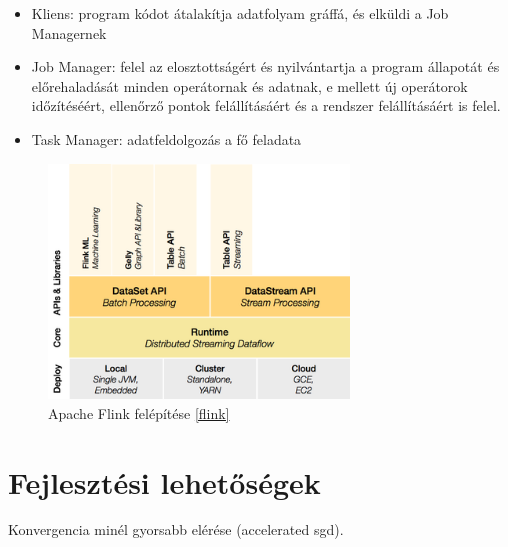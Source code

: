\documentclass[a4paper,12pt]{article}
\begin{document}
\begin{itemize}
\item Kliens: program kódot átalakítja adatfolyam gráffá, és elküldi a Job Managernek
\item Job Manager: felel az elosztottságért és nyilvántartja a program állapotát és előrehaladását minden operátornak és adatnak, e mellett új operátorok időzítéséért, ellenőrző pontok felállításáért és a rendszer felállításáért is felel.
\item Task Manager: adatfeldolgozás a fő feladata
\end{itemize}

\begin{figure}[ht!]
\centering
\includegraphics[width=80mm]{img/flink.png}
\caption{Apache Flink felépítése \ref{flink} \label{apache_flink}}
\end{figure}


\section{Fejlesztési lehetőségek}

Konvergencia minél gyorsabb elérése (accelerated sgd). 



\printbibliography

\end{document}
